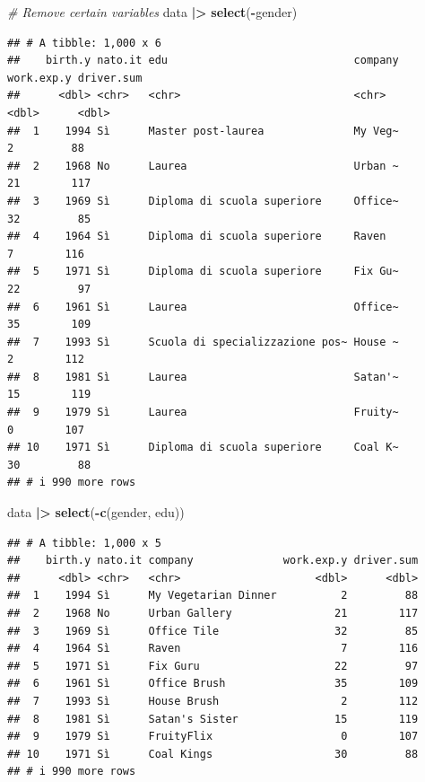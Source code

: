 \documentclass[
]{book}
\newenvironment{Shaded}{\begin{snugshade}}{\end{snugshade}}
\newcommand{\CommentTok}[1]{\textcolor[rgb]{0.56,0.35,0.01}{\textit{#1}}}
\newcommand{\FunctionTok}[1]{\textcolor[rgb]{0.13,0.29,0.53}{\textbf{#1}}}
\newcommand{\NormalTok}[1]{#1}
\newcommand{\SpecialCharTok}[1]{\textcolor[rgb]{0.81,0.36,0.00}{\textbf{#1}}}
\begin{document}
\begin{Shaded}
\begin{Highlighting}[]
\CommentTok{\# Remove certain variables}
\NormalTok{data }\SpecialCharTok{|\textgreater{}} 
  \FunctionTok{select}\NormalTok{(}\SpecialCharTok{{-}}\NormalTok{gender)}
\end{Highlighting}
\end{Shaded}

\begin{verbatim}
## # A tibble: 1,000 x 6
##    birth.y nato.it edu                             company work.exp.y driver.sum
##      <dbl> <chr>   <chr>                           <chr>        <dbl>      <dbl>
##  1    1994 Sì      Master post-laurea              My Veg~          2         88
##  2    1968 No      Laurea                          Urban ~         21        117
##  3    1969 Sì      Diploma di scuola superiore     Office~         32         85
##  4    1964 Sì      Diploma di scuola superiore     Raven            7        116
##  5    1971 Sì      Diploma di scuola superiore     Fix Gu~         22         97
##  6    1961 Sì      Laurea                          Office~         35        109
##  7    1993 Sì      Scuola di specializzazione pos~ House ~          2        112
##  8    1981 Sì      Laurea                          Satan'~         15        119
##  9    1979 Sì      Laurea                          Fruity~          0        107
## 10    1971 Sì      Diploma di scuola superiore     Coal K~         30         88
## # i 990 more rows
\end{verbatim}

\begin{Shaded}
\begin{Highlighting}[]
\NormalTok{data }\SpecialCharTok{|\textgreater{}} 
  \FunctionTok{select}\NormalTok{(}\SpecialCharTok{{-}}\FunctionTok{c}\NormalTok{(gender, edu))}
\end{Highlighting}
\end{Shaded}

\begin{verbatim}
## # A tibble: 1,000 x 5
##    birth.y nato.it company              work.exp.y driver.sum
##      <dbl> <chr>   <chr>                     <dbl>      <dbl>
##  1    1994 Sì      My Vegetarian Dinner          2         88
##  2    1968 No      Urban Gallery                21        117
##  3    1969 Sì      Office Tile                  32         85
##  4    1964 Sì      Raven                         7        116
##  5    1971 Sì      Fix Guru                     22         97
##  6    1961 Sì      Office Brush                 35        109
##  7    1993 Sì      House Brush                   2        112
##  8    1981 Sì      Satan's Sister               15        119
##  9    1979 Sì      FruityFlix                    0        107
## 10    1971 Sì      Coal Kings                   30         88
## # i 990 more rows
\end{verbatim}
\end{document}
